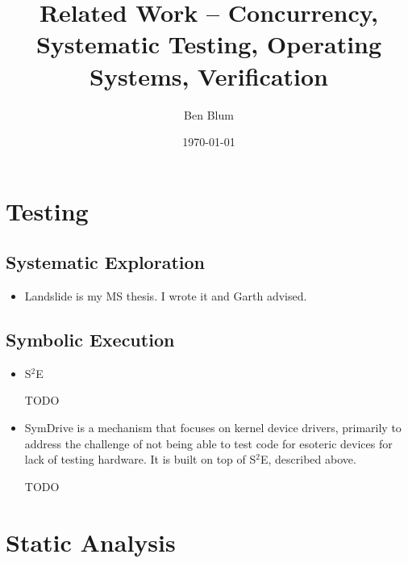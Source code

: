 \documentclass{article}
\begin{document}

\title{Related Work -- Concurrency, Systematic Testing, Operating Systems, Verification}
\author{Ben Blum}
\date{\today}
\maketitle


\section{Testing}

\subsection{Systematic Exploration}
\begin{itemize}
	\item Landslide \cite{Landslide} is my MS thesis. I wrote it and Garth advised.
\end{itemize}

\subsection{Symbolic Execution}
\begin{itemize}
	\item S$^2$E \cite{s2e}

		TODO

	\item SymDrive \cite{symdrive} is a mechanism that focuses on kernel device drivers, primarily to address the challenge of not being able to test code for esoteric devices for lack of testing hardware. It is built on top of S$^2$E, described above.

		TODO
\end{itemize}

\section{Static Analysis}
\end{document}
